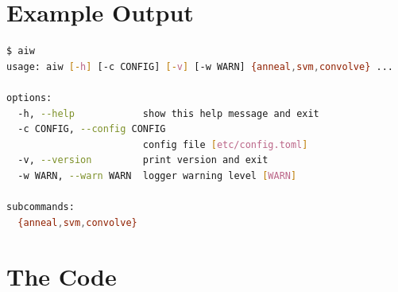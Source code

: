 \documentclass{article}
\begin{document}
\section{Example Output}

\begin{lstlisting}[language=bash, caption=Example Output of Program]
$ aiw
usage: aiw [-h] [-c CONFIG] [-v] [-w WARN] {anneal,svm,convolve} ...

options:
  -h, --help            show this help message and exit
  -c CONFIG, --config CONFIG
                        config file [etc/config.toml]
  -v, --version         print version and exit
  -w WARN, --warn WARN  logger warning level [WARN]

subcommands:
  {anneal,svm,convolve}
\end{lstlisting}

\section{The Code}
\end{document}
